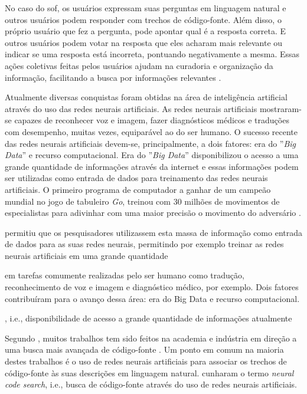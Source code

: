 No caso do \Gls{sof}, os usuários expressam suas perguntas em linguagem natural e outros usuários podem responder com trechos de código-fonte. Além disso, o próprio usuário que fez a pergunta, pode apontar qual é a resposta correta. E outros usuários podem votar na resposta que eles acharam mais relevante ou indicar se uma resposta está incorreta, pontuando negativamente a mesma. Essas ações coletivas feitas pelos usuários ajudam na curadoria e organização da informação, facilitando a busca por informações relevantes \citep{Wang-quora:2013, cambronero-deep-learning-code-search:2019}. 

Atualmente diversas conquistas foram obtidas na área de inteligência artificial através do uso das redes neurais artificiais. As redes neurais artificiais mostraram-se capazes de reconhecer voz e imagem, fazer diagnósticos médicos e traduções com desempenho, muitas vezes, equiparável ao do ser humano. O sucesso recente das redes neurais artificiais devem-se, principalmente, a dois fatores: era do ''\textit{Big Data}'' e recurso computacional. Era do ''\textit{Big Data}'' disponibilizou o acesso a uma grande quantidade de informações através da internet e essas informações podem ser utilizadas como entrada de dados para treinamento das redes neurais artificiais. O primeiro programa de computador a ganhar de um campeão mundial no jogo de tabuleiro \textit{Go}, treinou com 30 milhões de movimentos de especialistas para adivinhar com uma maior precisão o movimento do adversário \citep{silver-mastering-the-game-go:2016}. 

permitiu que os pesquisadores utilizassem esta massa de informação como entrada de dados para as suas redes neurais, permitindo por exemplo  treinar as redes neurais artificiais em uma grande quantidade


em tarefas comumente realizadas pelo ser humano como tradução, reconhecimento de voz e imagem e diagnóstico médico, por exemplo. Dois fatores contribuíram para o avanço dessa área: era do Big Data e recurso computacional.


, i.e., disponibilidade de acesso a grande quantidade de informações atualmente


Segundo \cite{cambronero-deep-learning-code-search:2019}, muitos trabalhos tem sido feitos na academia e indústria em direção a uma busca mais avançada de código-fonte \citep{Gu-deep-code-search:2018, yao-2018, iyer-etal-2016-summarizing, Allamanis-bimodal-source-code-natural-language:2015, Chen-bi-variational-autoencoder:2018, Sachdev-neural-code-search:2018, cambronero-deep-learning-code-search:2019}. Um ponto em comum na maioria destes trabalhos é o uso de redes neurais artificiais para associar os trechos de código-fonte às suas descrições em linguagem natural. \cite{cambronero-deep-learning-code-search:2019} cunharam o termo \textit{neural code search}, i.e., busca de código-fonte através do uso de redes neurais artificiais.





